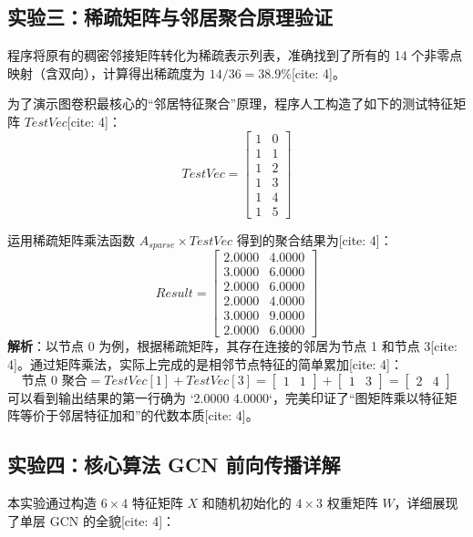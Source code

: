 \documentclass[12pt,a4paper]{article}
\begin{document}
\subsection{实验三：稀疏矩阵与邻居聚合原理验证}

程序将原有的稠密邻接矩阵转化为稀疏表示列表，准确找到了所有的 14 个非零点映射（含双向），计算得出稀疏度为 $14/36 = 38.9\%$[cite: 4]。

为了演示图卷积最核心的“邻居特征聚合”原理，程序人工构造了如下的测试特征矩阵 $TestVec$[cite: 4]：
\[
TestVec = \begin{bmatrix} 1 & 0 \\ 1 & 1 \\ 1 & 2 \\ 1 & 3 \\ 1 & 4 \\ 1 & 5 \end{bmatrix}
\]

运用稀疏矩阵乘法函数 $A_{sparse} \times TestVec$ 得到的聚合结果为[cite: 4]：
\[
Result = \begin{bmatrix}
2.0000 & 4.0000 \\
3.0000 & 6.0000 \\
2.0000 & 6.0000 \\
2.0000 & 4.0000 \\
3.0000 & 9.0000 \\
2.0000 & 6.0000 
\end{bmatrix}
\]
\textbf{解析}：以节点 0 为例，根据稀疏矩阵，其存在连接的邻居为节点 1 和节点 3[cite: 4]。通过矩阵乘法，实际上完成的是相邻节点特征的简单累加[cite: 4]：
\[ \text{节点 0 聚合} = TestVec[1] + TestVec[3] = \begin{bmatrix} 1 & 1 \end{bmatrix} + \begin{bmatrix} 1 & 3 \end{bmatrix} = \begin{bmatrix} 2 & 4 \end{bmatrix} \]
可以看到输出结果的第一行确为 `2.0000 4.0000`，完美印证了“图矩阵乘以特征矩阵等价于邻居特征加和”的代数本质[cite: 4]。

\subsection{实验四：核心算法 GCN 前向传播详解}

本实验通过构造 $6 \times 4$ 特征矩阵 $X$ 和随机初始化的 $4 \times 3$ 权重矩阵 $W$，详细展现了单层 GCN 的全貌[cite: 4]：
\end{document}
